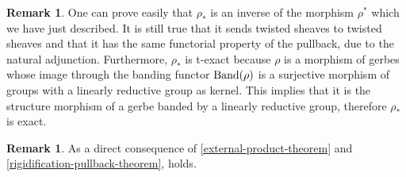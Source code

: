 \documentclass[11pt, twoside]{article} %
\numberwithin{equation}{section}
\theoremstyle{plain}
\theoremstyle{definition}
\newtheorem{rem}[thm]{Remark}
\begin{document}
	\begin{rem}\label{remark-theorem}
	One can prove easily that $\rho_*$ is an inverse of the morphism $\rho^*$ which we have just described. It is still true that it sends twisted sheaves to twisted sheaves and that it has the same functorial property of the pullback, due to the natural adjunction. Furthermore, $\rho_*$ is t-exact because $\rho$ is a morphism of gerbes whose image through the banding functor $\textup{Band}(\rho)$ is a surjective morphism of groups with a linearly reductive group as kernel. This implies that it is the structure morphism of a gerbe banded by a linearly reductive group, therefore $\rho_*$ is exact.
	\end{rem}

 \begin{rem}\label{Conjecture-holds}As a direct consequence of \cref{external-product-theorem} and \cref{rigidification-pullback-theorem}, \cite[Conjecture 5.27]{BP} holds.\end{rem}
\end{document}
